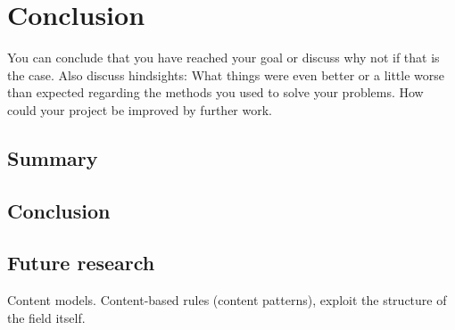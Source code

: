 \chapter{Conclusion}

You can conclude that you have reached your goal or discuss why not if that is the case. Also discuss hindsights: What things were even better or a little worse than expected regarding the methods you used to solve your problems. How could your project be improved by further work.

\section{Summary}

\section{Conclusion}

\section{Future research} %
\label{sec:section name}

Content models.
Content-based rules (content patterns), exploit the structure of the field itself.


